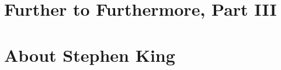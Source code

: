 \documentclass{article}
\numberwithin{equation}{section}
\begin{document}

\section{Further to Furthermore, Part III}


\section{About Stephen King}


\printbibliography[heading=bibintoc]
	
\end{document}
